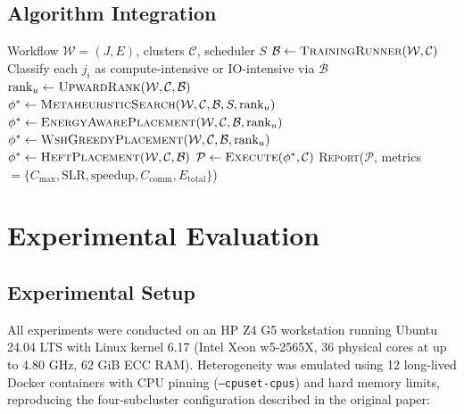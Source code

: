\documentclass[10pt,twocolumn]{article}
\begin{document}
\subsection{Algorithm Integration}

\begin{algorithm}[H]
\caption{WSH++ Main Scheduling Procedure}
\label{alg:wsh_pp}
\begin{algorithmic}[1]
\REQUIRE Workflow $\mathcal{W}=(J,E)$, clusters $\mathcal{C}$, scheduler $S$
\STATE $\mathcal{B} \leftarrow \textsc{TrainingRunner}(\mathcal{W}, \mathcal{C})$
\STATE Classify each $j_i$ as compute-intensive or IO-intensive via $\mathcal{B}$
\STATE $\text{rank}_u \leftarrow \textsc{UpwardRank}(\mathcal{W}, \mathcal{C}, \mathcal{B})$
  \STATE $\phi^* \leftarrow \textsc{MetaheuristicSearch}(\mathcal{W}, \mathcal{C}, \mathcal{B}, S,
         \text{rank}_u)$
  \STATE $\phi^* \leftarrow \textsc{EnergyAwarePlacement}(\mathcal{W}, \mathcal{C}, \mathcal{B},
         \text{rank}_u)$
  \STATE $\phi^* \leftarrow \textsc{WshGreedyPlacement}(\mathcal{W}, \mathcal{C}, \mathcal{B},
         \text{rank}_u)$
\ELSE
  \STATE $\phi^* \leftarrow \textsc{HeftPlacement}(\mathcal{W}, \mathcal{C}, \mathcal{B})$
\ENDIF
\STATE $\mathcal{P} \leftarrow \textsc{Execute}(\phi^*, \mathcal{C})$
\STATE \textsc{Report}($\mathcal{P}$, metrics $= \{C_{\max}, \text{SLR}, \text{speedup},
       C_{\text{comm}}, E_{\text{total}}\}$)
\end{algorithmic}
\end{algorithm}

\section{Experimental Evaluation}
\label{sec:evaluation}

\subsection{Experimental Setup}

All experiments were conducted on an HP Z4 G5 workstation running Ubuntu 24.04 LTS
with Linux kernel 6.17 (Intel Xeon w5-2565X, 36 physical cores at up to 4.80 GHz,
62 GiB ECC RAM). Heterogeneity was emulated using 12 long-lived Docker containers
with CPU pinning (\texttt{--cpuset-cpus}) and hard memory limits, reproducing the
four-subcluster configuration described in the original paper:
\end{document}
